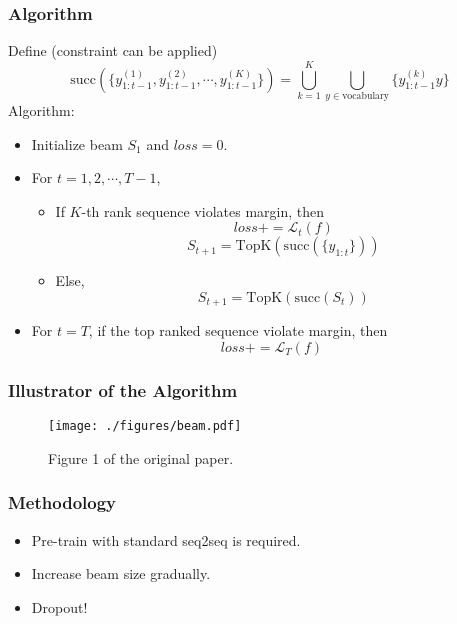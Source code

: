 \begin{frame}
  \frametitle{Algorithm}
  Define (constraint can be applied)
  $$
  \mathrm{succ}(\{y^{(1)}_{1:t-1}, y^{(2)}_{1:t-1}, \cdots, y^{(K)}_{1:t-1}\}) = 
  \bigcup_{k=1}^K \bigcup_{y \in \text{vocabulary}} \{ y^{(k)}_{1:t-1} y \}
  $$
  Algorithm:
  \begin{itemize}
  \item Initialize beam $S_1$ and $loss = 0$.
  \item For $t = 1, 2, \cdots, T - 1$,
    \begin{itemize}
    \item If $K$-th rank sequence violates margin, then
      $$loss += \mathcal{L}_t(f)$$
      $$S_{t + 1} = \mathrm{TopK}(\mathrm{succ}(\{ y_{1:t} \}))$$
    \item Else,
      $$S_{t + 1} = \mathrm{TopK}(\mathrm{succ}(S_t))$$
    \end{itemize}
  \item For $t = T$, if the top ranked sequence violate margin, then
    $$loss += \mathcal{L}_T(f)$$
  \end{itemize}
\end{frame}


\begin{frame}
  \frametitle{Illustrator of the Algorithm}
  \begin{figure}
    \centering
    \texttt{[image: ./figures/beam.pdf]}
    \caption{Figure 1 of the original paper.}
  \end{figure}
\end{frame}


\begin{frame}
  \frametitle{Methodology}
  \begin{itemize}
  \item Pre-train with standard seq2seq is required.
  \item Increase beam size gradually.
  \item Dropout!
  \end{itemize}
\end{frame}